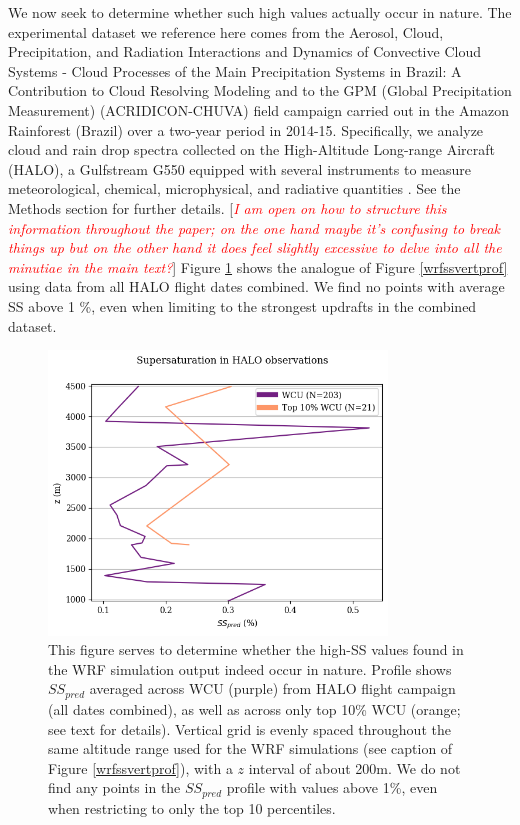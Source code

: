 \documentclass{article}
\newcommand{\klcomm}[1]{\textcolor{red}{\textit{#1}}}
\begin{document}
We now seek to determine whether such high values actually occur in nature. The experimental dataset we reference here comes from the Aerosol, Cloud, Precipitation, and Radiation Interactions and Dynamics of Convective Cloud Systems - Cloud Processes of the Main Precipitation Systems in Brazil: A Contribution to Cloud Resolving Modeling and to the GPM (Global Precipitation Measurement) (ACRIDICON-CHUVA) field campaign carried out in the Amazon Rainforest (Brazil) over a two-year period in 2014-15. Specifically, we analyze cloud and rain drop spectra collected on the High-Altitude Long-range Aircraft (HALO), a Gulfstream G550 equipped with several instruments to measure meteorological, chemical, microphysical, and radiative quantities \cite{Wendisch2016}. See the Methods section for further details. [\klcomm{I am open on how to structure this information throughout the paper; on the one hand maybe it's confusing to break things up but on the other hand it does feel slightly excessive to delve into all the minutiae in the main text?}] Figure \ref{halossvertprof} shows the analogue of Figure \ref{wrfssvertprof} using data from all HALO flight dates combined. We find no points with average SS above 1 \%, even when limiting to the strongest updrafts in the combined dataset.

\begin{figure}[ht]
    \centering
    \includegraphics[width=9cm]{halo/ss_pred_vs_z_figure.png}
    \caption{This figure serves to determine whether the high-SS values found in the WRF simulation output indeed occur in nature. Profile shows $SS_{pred}$ averaged across WCU (purple) from HALO flight campaign (all dates combined), as well as across only top 10\% WCU (orange; see text for details). Vertical grid is evenly spaced throughout the same altitude range used for the WRF simulations (see caption of Figure \ref{wrfssvertprof}), with a $z$ interval of about 200m. We do not find any points in the $SS_{pred}$ profile with values above 1\%, even when restricting to only the top 10 percentiles.}
    \label{halossvertprof}
\end{figure}
\end{document}
